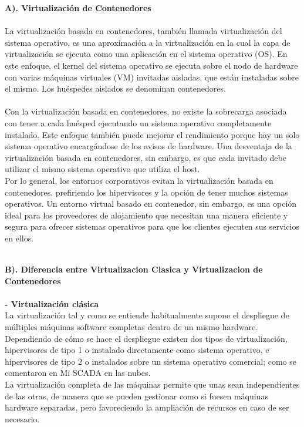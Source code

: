 \documentclass[twoside,twocolumn]{article}
\begin{document}
\begin{flushright}
\begin{itemize}
 \textbf{A). Virtualización de Contenedores }\\
\textbf{}\\
La virtualización basada en contenedores, también llamada virtualización del sistema operativo, es una aproximación a la virtualización en la cual la capa de virtualización se ejecuta como una aplicación en el sistema operativo (OS). En este enfoque, el kernel del sistema operativo se ejecuta sobre el nodo de hardware con varias máquinas virtuales (VM) invitadas aisladas, que están instaladas sobre el mismo. Los huéspedes aislados se denominan contenedores.\textbf{}\\
\textbf{}\\
Con la virtualización basada en contenedores, no existe la sobrecarga asociada con tener a cada huésped ejecutando un sistema operativo completamente instalado. Este enfoque también puede mejorar el rendimiento porque hay un solo sistema operativo encargándose de los avisos de hardware. Una desventaja de la virtualización basada en contenedores, sin embargo, es que cada invitado debe utilizar el mismo sistema operativo que utiliza el host.
\textbf{}\\
Por lo general, los entornos corporativos evitan la virtualización basada en contenedores, prefiriendo los hipervisores y la opción de tener muchos sistemas operativos. Un entorno virtual basado en contenedor, sin embargo, es una opción ideal para los proveedores de alojamiento que necesitan una manera eficiente y segura para ofrecer sistemas operativos para que los clientes ejecuten sus servicios en ellos.

\textbf{}\\
 \textbf{B). Diferencia entre Virtualizacion Clasica y Virtualizacion de Contenedores}\\
\textbf{}\\
\textbf{- Virtualización clásica}\\
La virtualización tal y como se entiende habitualmente supone el despliegue de múltiples máquinas software completas dentro de un mismo hardware. Dependiendo de cómo se hace el despliegue existen dos tipos de virtualización, hipervisores de tipo 1 o instalado directamente como sistema operativo, e hipervisores de tipo 2 o instalados sobre un sistema operativo comercial; como se comentaron en Mi SCADA en las nubes.\textbf{}\\
La virtualización completa de las máquinas permite que unas sean independientes de las otras, de manera que se pueden gestionar como si fuesen máquinas hardware separadas, pero favoreciendo la ampliación de recursos en caso de ser necesario.
\textbf{}\\


\end{itemize}
\end{flushright}
\end{document}

